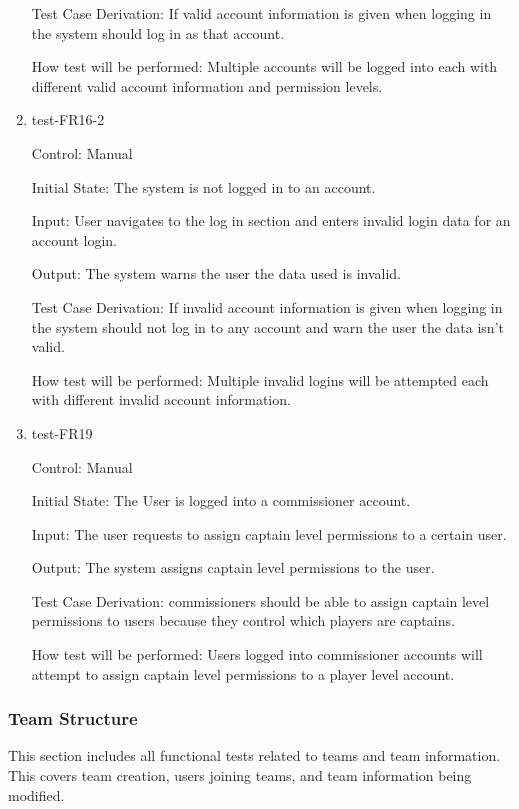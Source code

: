 \documentclass[12pt, titlepage]{article}
\begin{document}
\begin{enumerate}
  Test Case Derivation: If valid account information is given when logging in
  the system should log in as that account.

  How test will be performed: Multiple accounts will be logged into each with
  different valid account information and permission levels.

  \item{test-FR16-2\\}

  Control: Manual

  Initial State: The system is not logged in to an account.

  Input: User navigates to the log in section and enters invalid login data
  for an account login.

  Output: The system warns the user the data used is invalid.

  Test Case Derivation: If invalid account information is given when logging
  in the system should not log in to any account and warn the user the data
  isn't valid.

  How test will be performed: Multiple invalid logins will be attempted each
  with different invalid account information.

  \item{test-FR19\\}

  Control: Manual

  Initial State: The User is logged into a commissioner account.

  Input: The user requests to assign captain level permissions to a 
  certain user.

  Output: The system assigns captain level permissions to the user.

  Test Case Derivation: commissioners should be able to assign captain level
  permissions to users because they control which players are captains.

  How test will be performed: Users logged into commissioner accounts will attempt
  to assign captain level permissions to a player level account.

\end{enumerate}

\subsubsection{Team Structure}

This section includes all functional tests related to teams and team
information. This covers team creation, users joining teams, and team
information being modified.
\end{document}

